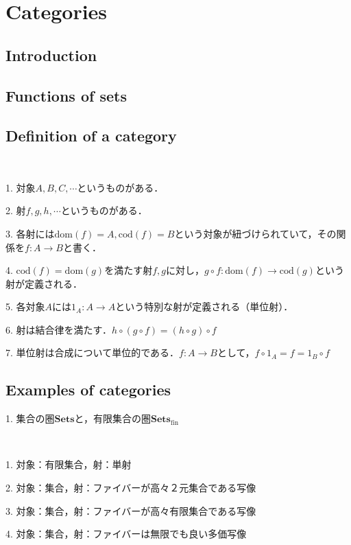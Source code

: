 \documentclass[uplatex, 12pt, dvipdfmx]{jsarticle}
\title{}
\author{司馬博文 J4-190549\\hirofumi-shiba48@g.ecc.u-tokyo.ac.jp}
\date{\today}
\begin{document}
\tableofcontents

\section{Categories}

\subsection{Introduction}
\subsection{Functions of sets}
\subsection{Definition of a category}
\begin{definition}[Category]　

    1. 対象$A,B,C,\cdots$というものがある．

    2. 射$f,g,h,\cdots$というものがある．

    3. 各射には$\mathrm{dom}(f)=A, \mathrm{cod}(f)=B$という対象が紐づけられていて，その関係を$f:A\to B$と書く．

    4. $\mathrm{cod}(f)=\mathrm{dom}(g)$を満たす射$f,g$に対し，$g\circ f:\mathrm{dom}(f)\to \mathrm{cod}(g)$という射が定義される．

    5. 各対象$A$には$1_A:A\to A$という特別な射が定義される（単位射）．

    6. 射は結合律を満たす．$h\circ (g\circ f)=(h\circ g)\circ f$

    7. 単位射は合成について単位的である．$f:A\to B$として，$f\circ 1_A=f=1_B\circ f$
\end{definition}

\subsection{Examples of categories}

1. 集合の圏$\mathbf{Sets}$と，有限集合の圏$\mathbf{Sets}_\mathrm{fin}$
\begin{example_*}　

    1. 対象：有限集合，射：単射

    2. 対象：集合，射：ファイバーが高々２元集合である写像

    3. 対象：集合，射：ファイバーが高々有限集合である写像

    4. 対象：集合，射：ファイバーは無限でも良い多価写像
\end{example_*}
\end{document}
